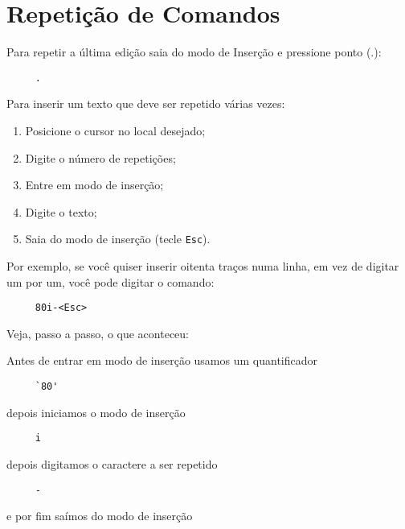 
\chapter{Repetição de Comandos}\label{Repetição de comandos}

Para repetir a última edição saia do modo de Inserção e pressione ponto (.):

\begin{verbatim}
     .
\end{verbatim}

Para inserir um texto que deve ser repetido várias vezes:

\begin{enumerate}
\item  Posicione o cursor no local desejado;
\item  Digite o número de repetições;
\item  Entre em modo de inserção;
\item  Digite o texto;
\item  Saia do modo de inserção (tecle {\tt Esc}).
\end{enumerate}

Por exemplo, se você quiser inserir oitenta traços numa linha, em vez
de digitar um por um, você pode digitar o comando:

\begin{verbatim}
     80i-<Esc>
\end{verbatim}

Veja, passo a passo, o que aconteceu:

 Antes de entrar em modo de inserção usamos um quantificador

\begin{verbatim}
     `80'
\end{verbatim}

 depois iniciamos o modo de inserção

\begin{verbatim}
     i
\end{verbatim}

depois digitamos o caractere a ser repetido

\begin{verbatim}
     -
\end{verbatim}

e por fim saímos do modo de inserção

